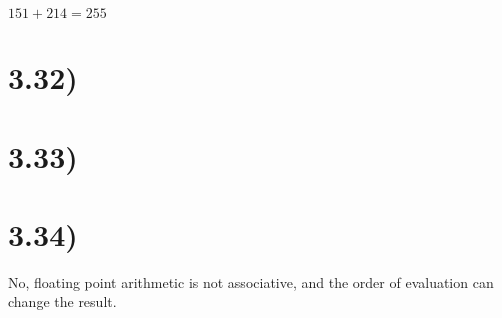 \documentclass[a4paper,11pt]{article}
\begin{document}
$151+214=255$


\section*{3.32)} 


\section*{3.33)} 


\section*{3.34)} 
No,  floating point arithmetic is not associative, and the order of evaluation can change the result.  

\end{document}
